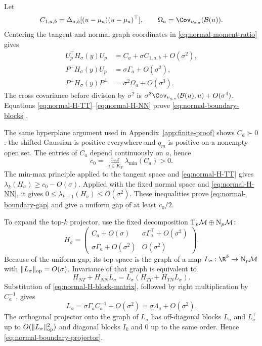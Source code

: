 Let
\begin{equation}
  C_{1,a,b}
  =
  \Delta_{a,b}[(u-\mu_a)(u-\mu_a)^\top],
  \qquad
  \Omega_a=\Cov_{\nu_{q,a}}(\mathcal B(u)).
\end{equation}
Centering the tangent and normal graph coordinates in
\eqref{eq:normal-moment-ratio} gives
\begin{align}
  U_p^\top H_\sigma(y)U_p
  &=C_a+\sigma C_{1,a,b}+O(\sigma^2),\label{eq:normal-H-TT}\\
  P^\perp H_\sigma(y)U_p
  &=\sigma\Gamma_a+O(\sigma^2),\label{eq:normal-H-NT}\\
  P^\perp H_\sigma(y)P^\perp
  &=\sigma^2\Omega_a+O(\sigma^3).
  \label{eq:normal-H-NN}
\end{align}
The cross covariance before division by $\sigma^2$ is
$\sigma^3\Cov_{\nu_{q,a}}(\mathcal B(u),u)+O(\sigma^4)$.
Equations \eqref{eq:normal-H-TT}--\eqref{eq:normal-H-NN} prove
\eqref{eq:normal-boundary-blocks}.

The same hyperplane argument used in
Appendix~\ref{app:finite-proof} shows $C_a\succ0$: the shifted Gaussian
is positive everywhere and $q_m$ is positive on a nonempty open set.
The entries of $C_a$ depend continuously on $a$, hence
\begin{equation}
  c_0=\inf_{a\in K_T}\lambda_{\min}(C_a)>0.
  \label{eq:normal-c0-proof}
\end{equation}
The min-max principle applied to the tangent space and
\eqref{eq:normal-H-TT} gives
$\lambda_k(H_\sigma)\ge c_0-O(\sigma)$.  Applied with the fixed normal
space and \eqref{eq:normal-H-NN}, it gives
$0\le\lambda_{k+1}(H_\sigma)\le O(\sigma^2)$.  These inequalities prove
\eqref{eq:normal-boundary-gap} and give a uniform gap of at least $c_0/2$.

To expand the top-$k$ projector, use the fixed decomposition
$\mathrm{T}_p\mathcal{M}\oplus\mathrm{N}_p\mathcal{M}$:
\begin{equation}
  H_\sigma
  =
  \begin{pmatrix}
    C_a+O(\sigma)&\sigma\Gamma_a^\top+O(\sigma^2)\\
    \sigma\Gamma_a+O(\sigma^2)&O(\sigma^2)
  \end{pmatrix}.
  \label{eq:normal-H-block-matrix}
\end{equation}
Because of the uniform gap, its top space is the graph of a map
$L_\sigma:\R^k\to\N_p\M$ with $\|L_\sigma\|_{\mathrm{op}}=O(\sigma)$.
Invariance of that graph is equivalent to
\begin{equation}
  H_{NT}+H_{NN}L_\sigma
  =
  L_\sigma(H_{TT}+H_{TN}L_\sigma).
\end{equation}
Substitution of \eqref{eq:normal-H-block-matrix}, followed by right
multiplication by $C_a^{-1}$, gives
\begin{equation}
  L_\sigma=\sigma\Gamma_aC_a^{-1}+O(\sigma^2)
  =\sigma\Lambda_a+O(\sigma^2).
\end{equation}
The orthogonal projector onto the graph of $L_\sigma$ has off-diagonal
blocks $L_\sigma$ and $L_\sigma^\top$ up to $O(\|L_\sigma\|_{\mathrm{op}}^2)$ and
diagonal blocks $I_k$ and $0$ up to the same order.  Hence
\eqref{eq:normal-boundary-projector}.

